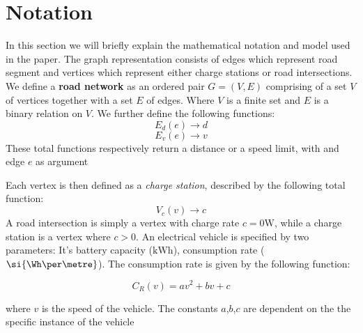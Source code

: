 \section{Notation}
In this section we will briefly explain the mathematical notation and model used in the paper. The graph representation consists of edges which represent road segment and vertices which represent either charge stations or road intersections. We define a \textbf{road network} as an ordered pair \(G=(V,E)\) comprising of a set $V$ of vertices together with a set $E$ of edges. Where $V$ is a finite set and $E$ is a binary relation on $V$. We further define the following functions:
\[ E_d(e)\rightarrow d \] 
\[ E_v(e)\rightarrow v \] 
These total functions respectively return a distance or a speed limit, with and edge $e$ as argument

Each vertex is then defined as a \textit{charge station}, described by the following total function:
\[V_c(v)\rightarrow c\]
A road intersection is simply a vertex with charge rate $c = 0\si{\W}$, while a charge station is a vertex where $c > 0$. An electrical vehicle is specified by two parameters: It's battery capacity ($\si{\kWh}$), consumption rate ($\si{\Wh\per\metre}$). The consumption rate is given by the following function:

\[C_R(v)=av^2+bv+c\]

where $v$ is the speed of the vehicle. The constants $a$,$b$,$c$ are dependent on the the specific instance of the vehicle  


